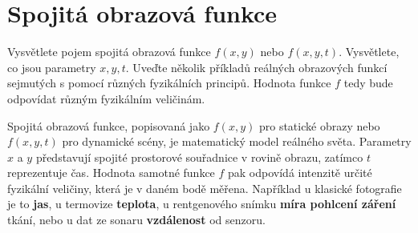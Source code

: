 \section{Spojitá obrazová funkce}
Vysvětlete pojem spojitá obrazová funkce $f (x, y)$ nebo $f (x, y, t)$. Vysvětlete, co jsou parametry $x, y, t$. Uveďte 
několik příkladů reálných obrazových funkcí sejmutých s pomocí různých fyzikálních principů. Hodnota funkce $f$ tedy 
bude odpovídat různým fyzikálním veličinám.

Spojitá obrazová funkce, popisovaná jako $f(x,y)$ pro statické obrazy nebo $f(x,y,t)$ pro dynamické scény, je 
matematický model reálného světa. Parametry $x$ a $y$ představují spojité prostorové souřadnice v rovině obrazu, zatímco 
$t$ reprezentuje čas. Hodnota samotné funkce $f$ pak odpovídá intenzitě určité fyzikální veličiny, která je v daném bodě 
měřena. Například u klasické fotografie je to \textbf{jas}, u termovize \textbf{teplota}, u rentgenového snímku 
\textbf{míra pohlcení záření} tkání, nebo u dat ze sonaru \textbf{vzdálenost} od senzoru.